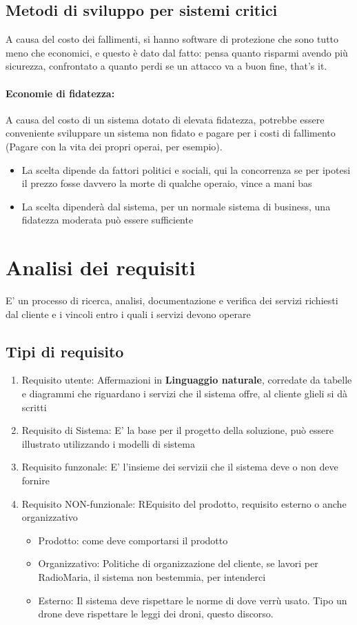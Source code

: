 \documentclass[12pt, a4paper, openany, twoside]{book}
\begin{document}
\subsection{Metodi di sviluppo per sistemi critici}
A causa del costo dei fallimenti, si hanno software di protezione che sono tutto
meno che economici, e questo è dato dal fatto: pensa quanto risparmi avendo più
sicurezza, confrontato a quanto perdi se un attacco va a buon fine, that's it.
\paragraph{Economie di fidatezza:} A causa del costo di un sistema dotato di 
elevata fidatezza, potrebbe essere conveniente sviluppare un sistema non fidato e
pagare per i costi di fallimento (Pagare con la vita dei propri operai, per esempio).
\begin{itemize}
	\item La scelta dipende da fattori politici e sociali, qui la concorrenza se
	per ipotesi il prezzo fosse davvero la morte di qualche operaio, vince a mani
	bas
	\item La scelta dipenderà dal sistema, per un normale sistema di business, una
	fidatezza moderata può essere sufficiente
\end{itemize}
\section{Analisi dei requisiti}
E' un processo di ricerca, analisi, documentazione e verifica dei servizi richiesti
dal cliente e i vincoli entro i quali i servizi devono operare
\subsection{Tipi di requisito}
\begin{enumerate}
	\item Requisito utente: Affermazioni in \textbf{Linguaggio naturale}, corredate
	da tabelle e diagrammi che riguardano i servizi che il sistema offre, al cliente
	glieli si dà scritti
	\item Requisito di Sistema: E' la base per il progetto della soluzione, può
	essere illustrato utilizzando i modelli di sistema 
	\item Requisito funzonale: E' l'insieme dei servizii che il sistema deve o non
	deve fornire
	\item Requisito NON-funzionale: REquisito del prodotto, requisito esterno o 
	anche organizzativo
	\begin{itemize}
		\item Prodotto: come deve comportarsi il prodotto
		\item Organizzativo: Politiche di organizzazione del cliente, se lavori 
		per RadioMaria, il sistema non bestemmia, per intenderci
		\item Esterno: Il sistema deve rispettare le norme di dove verrù usato.
		Tipo un drone deve rispettare le leggi dei droni, questo discorso.
	\end{itemize}
\end{enumerate}
\end{document}
